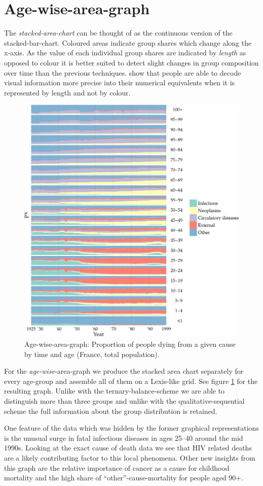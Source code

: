 \documentclass[a4paper]{scrartcl}
\begin{document}
\section*{Age-wise-area-graph}

The \emph{stacked-area-chart} can be thought of as the continuous version of the stacked-bar-chart. Coloured areas indicate group shares which change along the x-axis. As the value of each individual group shares are indicated by \emph{length} as opposed to colour it is better suited to detect slight changes in group composition over time than the previous techniques. \textcite{Cleveland1984} show that people are able to decode visual information more precise into their numerical equivalents when it is represented by length and not by colour.

\begin{figure}[htb!]
  \centering
  \includegraphics[width = 0.7\linewidth]{../fig/plot-agewise_area.pdf}
  \caption{Age-wise-area-graph: Proportion of people dying from a given cause by time and age (France, total population).}
  \label{fig:aag}
\end{figure}

For the \emph{age-wise}-area-graph we produce the stacked area chart separately for every age-group and assemble all of them on a Lexis-like grid. See figure \ref{fig:aag} for the resulting graph. Unlike with the ternary-balance-scheme we are able to distinguish more than three groups and unlike with the qualitative-sequential scheme the full information about the group distribution is retained.

One feature of the data which was hidden by the former graphical representations is the unusual surge in fatal infectious diseases in ages 25--40 around the mid 1990s. Looking at the exact cause of death data we see that HIV related deaths are a likely contributing factor to this local phenomena. Other new insights from this graph are the relative importance of cancer as a cause for childhood mortality and the high share of \enquote{other}-cause-mortality for people aged 90+.
\end{document}
